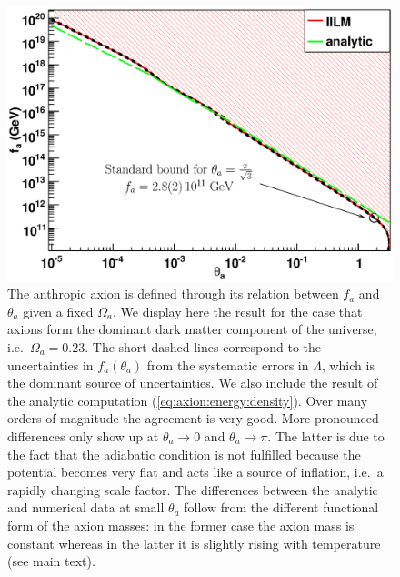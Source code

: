 \documentclass[preprint,nofootinbib]{revtex4}
\begin{document}
\begin{figure}[tbp]
\begin{center}
\includegraphics[width=\figwidth,clip=true,trim=0mm 0mm 15mm 10mm]{ThetaFa.eps}
\caption{The anthropic axion is defined through its relation between $f_a$ and $\theta_a$ given a fixed $\Omega_a$. We display here the result for the case that axions form the dominant dark matter component of the universe, i.e.\ $\Omega_a=0.23$. The short-dashed lines correspond to the uncertainties in $f_a(\theta_a)$ from the systematic errors in $\Lambda$, which is the dominant source of uncertainties. We also include the result of the analytic computation (\ref{eq:axion:energy:density}). Over many orders of magnitude the agreement is very good. More pronounced differences only show up at $\theta_a \to 0$ and $\theta_a \to \pi$. The latter is due to the fact that the adiabatic condition is not fulfilled because the potential becomes very flat and acts like a source of inflation, i.e.\ a rapidly changing scale factor. The differences between the analytic and numerical data at small $\theta_a$ follow from the different functional form of the axion masses: in the former case the axion mass is constant whereas in the latter it is slightly rising with temperature (see main text).}
\label{fig:ThetaFa}
\end{center}
\end{figure}
\end{document}
